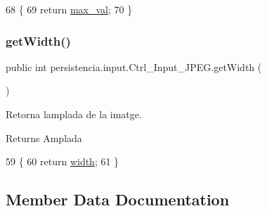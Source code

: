 \begin{DoxyCode}
68                            \{
69         \textcolor{keywordflow}{return} \hyperlink{classpersistencia_1_1input_1_1Ctrl__Input__JPEG_a8720235be6a11ef90085217064bbb1b0}{max\_val};
70     \}
\end{DoxyCode}
\mbox{\label{classpersistencia_1_1input_1_1Ctrl__Input__JPEG_ab4cd4c26db5bd1ce89f6e53458c99ba8}} 
\subsubsection{\texorpdfstring{get\+Width()}{getWidth()}}
{\footnotesize\ttfamily public int persistencia.\+input.\+Ctrl\+\_\+\+Input\+\_\+\+J\+P\+E\+G.\+get\+Width (\begin{DoxyParamCaption}{ }\end{DoxyParamCaption})\hspace{0.3cm}{\ttfamily [inline]}}



Retorna l\textquotesingle{}amplada de la imatge. 

\begin{DoxyReturn}{Returns}
Amplada 
\end{DoxyReturn}

\begin{DoxyCode}
59                           \{
60         \textcolor{keywordflow}{return} \hyperlink{classpersistencia_1_1input_1_1Ctrl__Input__JPEG_a07d902b25b54941dc0444398c7d380e7}{width};
61     \}
\end{DoxyCode}


\subsection{Member Data Documentation}
\mbox{\label{classpersistencia_1_1input_1_1Ctrl__Input__JPEG_a9e6805b998e58981f8cd7b8b6e609f27}} 
